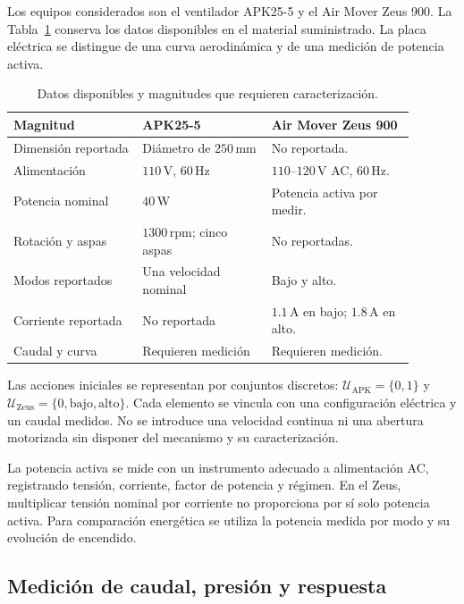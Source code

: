 Los equipos considerados son el ventilador APK25-5 y el Air Mover Zeus 900. La Tabla~\ref{met:tabla_actuadores} conserva los datos disponibles en el material suministrado. La placa eléctrica se distingue de una curva aerodinámica y de una medición de potencia activa.
\begin{table}[htbp]
\centering
\small
\caption{Datos disponibles y magnitudes que requieren caracterización.}
\label{met:tabla_actuadores}
\begin{tabular}{>{\raggedright\arraybackslash}p{0.29\linewidth}>{\raggedright\arraybackslash}p{0.29\linewidth}>{\raggedright\arraybackslash}p{0.31\linewidth}}
\toprule
Magnitud & APK25-5 & Air Mover Zeus 900 \\
\midrule
Dimensión reportada & Diámetro de $250\,\mathrm{mm}$ & No reportada. \\
Alimentación & $110\,\mathrm V$, $60\,\mathrm{Hz}$ & $110$--$120\,\mathrm V$ AC, $60\,\mathrm{Hz}$. \\
Potencia nominal & $40\,\mathrm W$ & Potencia activa por medir. \\
Rotación y aspas & $1300\,\mathrm{rpm}$; cinco aspas & No reportadas. \\
Modos reportados & Una velocidad nominal & Bajo y alto. \\
Corriente reportada & No reportada & $1.1\,\mathrm A$ en bajo; $1.8\,\mathrm A$ en alto. \\
Caudal y curva & Requieren medición & Requieren medición. \\
\bottomrule
\end{tabular}
\end{table}

Las acciones iniciales se representan por conjuntos discretos: $\mathcal U_{\mathrm{APK}}=\{0,1\}$ y $\mathcal U_{\mathrm{Zeus}}=\{0,\mathrm{bajo},\mathrm{alto}\}$. Cada elemento se vincula con una configuración eléctrica y un caudal medidos. No se introduce una velocidad continua ni una abertura motorizada sin disponer del mecanismo y su caracterización.

La potencia activa se mide con un instrumento adecuado a alimentación AC, registrando tensión, corriente, factor de potencia y régimen. En el Zeus, multiplicar tensión nominal por corriente no proporciona por sí solo potencia activa. Para comparación energética se utiliza la potencia medida por modo y su evolución de encendido.

\subsection{Medición de caudal, presión y respuesta}
\label{met:caudal}


